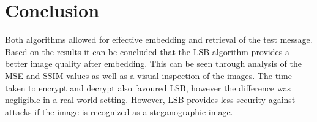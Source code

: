 \documentclass[11pt,letterpaper]{article}
\begin{document}
\section{Conclusion}
Both algorithms allowed for effective embedding and retrieval of the test message. Based on the results it can be concluded that the LSB algorithm provides a better image quality after embedding. This can be seen through analysis of the MSE and SSIM values as well as a visual inspection of the images. The time taken to encrypt and decrypt also favoured LSB, however the difference was negligible in a real world setting. However, LSB provides less security against attacks if the image is recognized as a steganographic image.
\end{document}
